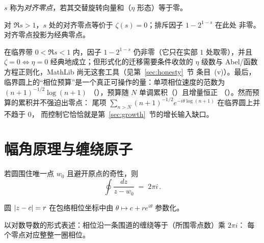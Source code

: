 \begin{definition}\label{def:align}
$s$ 称为\emph{对齐零点}，若其交替旋转向量和（$\eta$ 形态）等于零。
\end{definition}

\begin{theorem}\label{thm:align}
对 $\Re s>1$，$s$ 处的对齐零点等价于 $\zeta(s)=0$；排斥因子 $1-2^{1-s}$ 在此处
非零。对齐零点投影为经典零点。
\end{theorem}

\begin{remark}
在临界带 $0<\Re s<1$ 内，因子 $1-2^{1-s}$ 仍非零（它只在实部 $1$ 处取零），并且
$\zeta=0\Longleftrightarrow\eta=0$ 经典地成立；但形式化的迁移需要条件收敛的
$\eta$ 级数与 Abel/函数方程正则化，MathLib 尚无这套工具（见第~\ref{sec:honesty}~节
条目~(v)）。最后，临界圆上的“相位预算”是一个真正可操作的量：单项相位速度的范数为
$(n+1)^{-1/2}\log(n+1)$
（），预算随 $N$
单调累积（）且增量恒正
（）。然而预算的累积并不强迫出零点：
尾项 $\sum_{n>N}(n+1)^{-1/2}e^{-i\theta\log(n+1)}$ 在临界圆上并不趋于 $0$，
而控制它恰恰就是第~\ref{sec:growth}~节的增长输入缺口。
\end{remark}

\section{幅角原理与缠绕原子}\label{sec:winding}

\begin{theorem}\label{thm:atom}
若圆围住唯一点 $w_{0}$ 且避开原点的奇性，则
\[
  \oint \frac{dz}{z-w_{0}} \;=\; 2\pi i\, .
\]
\end{theorem}

\begin{proposition}\label{prop:param}
圆 $\lvert z-c\rvert=r$ 在包络相位坐标中由 $\theta\mapsto c+r e^{i\theta}$ 参数化。
\end{proposition}

\begin{theorem}\label{thm:phasewind}
以对数导数的形式表述：相位沿一条围道的缠绕等于（所围零点数）乘 $2\pi i$：
每个零点对应整整一圈相位。
\end{theorem}

